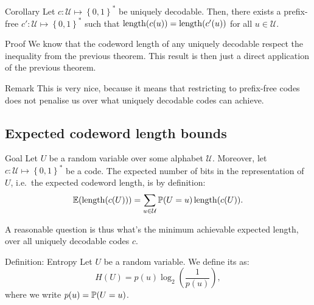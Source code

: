 \documentclass[a4paper]{article}
\begin{document}
\begin{parag}{Corollary}
    Let $c: \mathcal{U} \mapsto \left\{0, 1\right\}^*$ be uniquely decodable. Then, there exists a prefix-free $c': \mathcal{U} \mapsto \left\{0, 1\right\}^*$ such that $\length\left(c\left(u\right)\right) = \length\left(c'\left(u\right)\right)$ for all $u \in \mathcal{U}$.

    \begin{subparag}{Proof}
        We know that the codeword length of any uniquely decodable respect the inequality from the previous theorem. This result is then just a direct application of the previous theorem.
    \end{subparag}

    \begin{subparag}{Remark}
        This is very nice, because it means that restricting to prefix-free codes does not penalise us over what uniquely decodable codes can achieve.
    \end{subparag}
\end{parag}


\subsection{Expected codeword length bounds}

\begin{parag}{Goal}
    Let $U$ be a random variable over some alphabet $\mathcal{U}$. Moreover, let $c: \mathcal{U} \mapsto \left\{0, 1\right\}^*$ be a code. The expected number of bits in the representation of $U$, i.e.~the expected codeword length, is by definition: 
    \[\exval\left(\length\left(c\left(U\right)\right)\right) = \sum_{u \in \mathcal{U}} \prob\left(U = u\right) \length\left(c\left(U\right)\right).\]
    
    A reasonable question is thus what's the minimum achievable expected length, over all uniquely decodable codes $c$.
\end{parag}

\begin{parag}{Definition: Entropy}
    Let $U$ be a random variable. We define its  as: 
    \[H\left(U\right) = p\left(u\right) \log_2\left(\frac{1}{p\left(u\right)}\right),\]
    where we write $p\left(u\right) = \prob\left(U = u\right)$.
\end{parag}
\end{document}
